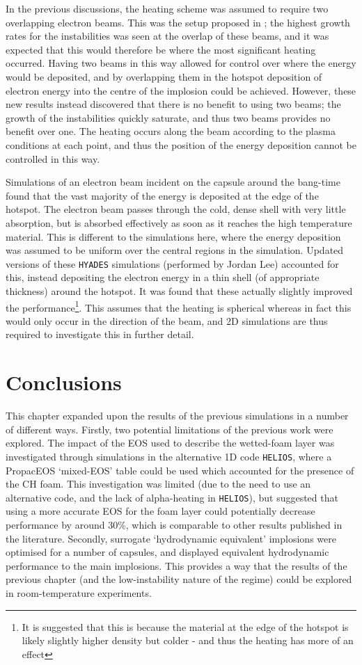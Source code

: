 In the previous discussions, the heating scheme was assumed to require two overlapping electron beams. This was the setup proposed in \cite{Ratan2017}; the highest growth rates for the instabilities was seen at the overlap of these beams, and it was expected that this would therefore be where the most significant heating occurred. Having two beams in this way allowed for control over where the energy would be deposited, and by overlapping them in the hotspot deposition of electron energy into the centre of the implosion could be achieved. However, these new results instead discovered that there is no benefit to using two beams; the growth of the instabilities quickly saturate, and thus two beams provides no benefit over one. The heating occurs along the beam according to the plasma conditions at each point, and thus the position of the energy deposition cannot be controlled in this way.

Simulations of an electron beam incident on the capsule around the bang-time found that the vast majority of the energy is deposited at the edge of the hotspot. The electron beam passes through the cold, dense shell with very little absorption, but is absorbed effectively as soon as it reaches the high temperature material. This is different to the simulations here, where the energy deposition was assumed to be uniform over the central regions in the simulation. Updated versions of these \texttt{HYADES} simulations (performed by Jordan Lee) accounted for this, instead depositing the electron energy in a thin shell (of appropriate thickness) around the hotspot. It was found that these actually slightly improved the performance\footnote{It is suggested that this is because the material at the edge of the hotspot is likely slightly higher density but colder - and thus the heating has more of an effect}. This assumes that the heating is spherical whereas in fact this would only occur in the direction of the beam, and 2D simulations are thus required to investigate this in further detail.

\section{Conclusions}
This chapter expanded upon the results of the previous simulations in a number of different ways. Firstly, two potential limitations of the previous work were explored. The impact of the EOS used to describe the wetted-foam layer was investigated through simulations in the alternative 1D code \texttt{HELIOS}, where a PropacEOS `mixed-EOS' table could be used which accounted for the presence of the CH foam. This investigation was limited (due to the need to use an alternative code, and the lack of alpha-heating in \texttt{HELIOS}), but suggested that using a more accurate EOS for the foam layer could potentially decrease performance by around 30\%, which is comparable to other results published in the literature. Secondly, surrogate `hydrodynamic equivalent' implosions were optimised for a number of capsules, and displayed equivalent hydrodynamic performance to the main implosions. This provides a way that the results of the previous chapter (and the low-instability nature of the regime) could be explored in room-temperature experiments.

